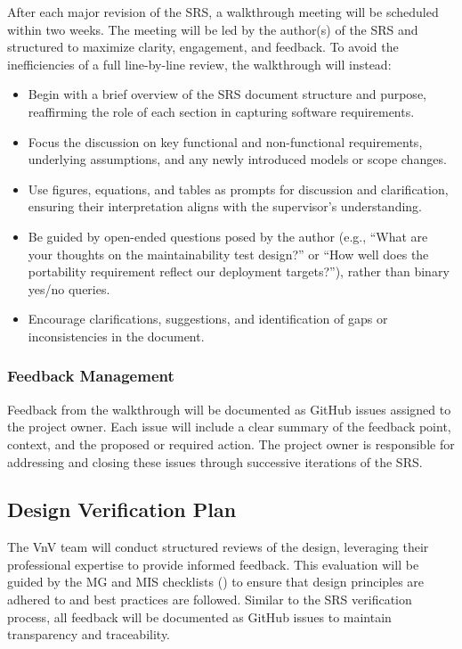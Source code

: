 \documentclass[12pt, titlepage]{article}
\begin{document}
After each major revision of the SRS, a walkthrough meeting will be scheduled
within two weeks. The meeting will be led by the author(s) of the SRS and
structured to maximize clarity, engagement, and feedback. To avoid the
inefficiencies of a full line-by-line review, the walkthrough will instead:

\begin{itemize}
\item Begin with a brief overview of the SRS document structure and purpose,
  reaffirming the role of each section in capturing software requirements.
\item Focus the discussion on key functional and non-functional requirements,
  underlying assumptions, and any newly introduced models or scope changes.
\item Use figures, equations, and tables as prompts for discussion and
  clarification, ensuring their interpretation aligns with the supervisor’s
  understanding.
\item Be guided by open-ended questions posed by the author (e.g., “What are your
  thoughts on the maintainability test design?” or “How well does the
  portability requirement reflect our deployment targets?”), rather than binary
  yes/no queries.
\item Encourage clarifications, suggestions, and identification of gaps or
  inconsistencies in the document.
\end{itemize}

\subsubsection{Feedback Management}
\label{sec:feedbackmanagement}

Feedback from the walkthrough will be documented as GitHub issues assigned to
the project owner. Each issue will include a clear summary of the feedback
point, context, and the proposed or required action. The project owner is
responsible for addressing and closing these issues through successive
iterations of the SRS.


\subsection{Design Verification Plan}

The VnV team will conduct structured reviews of the design, leveraging their
professional expertise to provide informed feedback. This evaluation will be
guided by the MG and MIS checklists (\cite{MG_checklist, MIS_checklist}) to ensure
that design principles are adhered to and best practices are followed. Similar
to the SRS verification process, all feedback will be documented as GitHub
issues to maintain transparency and traceability.
\end{document}
